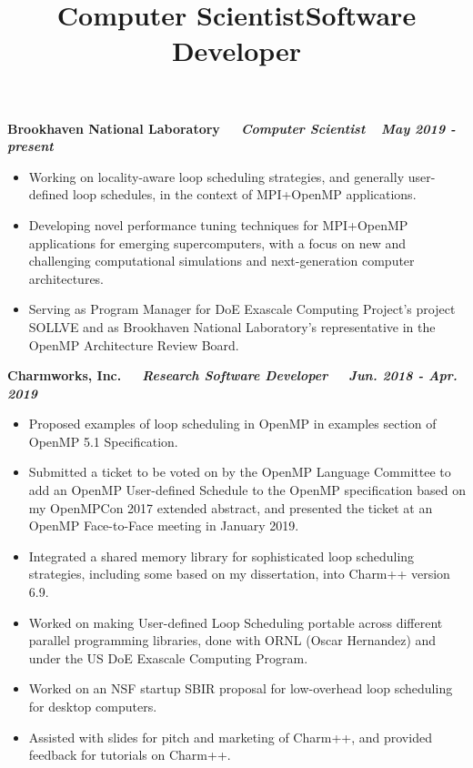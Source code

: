 
\title{Computer Scientist}

{\bf Brookhaven National Laboratory $\>$$\>$$\>$$\>$ \textit{Computer Scientist} $\>$$\>$$\>$$\>$\textit{May 2019 - present}}
\begin{itemize}
    \item Working on locality-aware loop scheduling strategies, and generally user-defined loop schedules, in the context of MPI+OpenMP applications.
\item  Developing novel performance tuning techniques for MPI+OpenMP applications for emerging supercomputers, with a focus on new and challenging computational simulations and next-generation computer architectures.
\item Serving as Program Manager for DoE Exascale Computing Project's project SOLLVE and as Brookhaven National Laboratory's representative in the OpenMP Architecture Review Board.
\end{itemize}

\title{Software Developer}

{\bf Charmworks, Inc. $\>$$\>$$\>$$\>$ \textit{Research Software Developer} $\>$$\>$$\>$$\>$ \textit{Jun. 2018 - Apr. 2019}}
\vspace{0.0in}
\begin{itemize}
\item Proposed examples of loop scheduling in OpenMP in examples section of OpenMP 5.1 Specification.
\item Submitted a ticket to be voted on by the OpenMP Language Committee to add an OpenMP User-defined Schedule to the OpenMP specification based on my OpenMPCon 2017 extended abstract, and presented the ticket at an OpenMP Face-to-Face meeting in January 2019.
\item Integrated a shared memory library for sophisticated loop scheduling strategies, including some based on my dissertation, into Charm++ version 6.9.
\item Worked on making User-defined Loop Scheduling portable across different parallel programming libraries, done with ORNL (Oscar Hernandez) and under the US DoE Exascale Computing Program.
\item Worked on an NSF startup SBIR proposal for low-overhead loop scheduling for desktop computers.
\item Assisted with slides for pitch and marketing of Charm++, and provided feedback for tutorials on Charm++.
\end{itemize}

